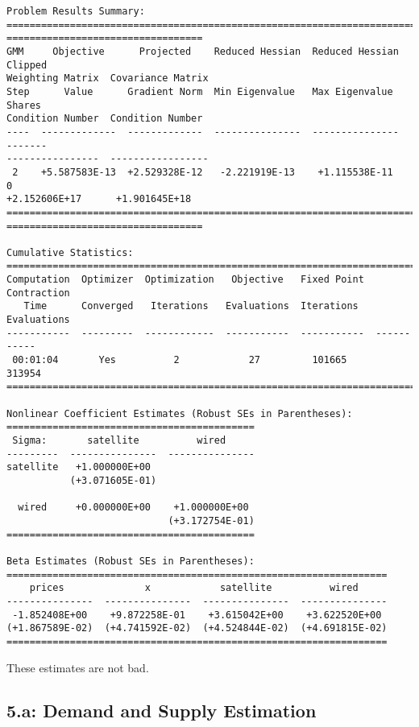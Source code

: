 \begin{Verbatim}[commandchars=\\\{\}]
Problem Results Summary:
================================================================================
==================================
GMM     Objective      Projected    Reduced Hessian  Reduced Hessian  Clipped
Weighting Matrix  Covariance Matrix
Step      Value      Gradient Norm  Min Eigenvalue   Max Eigenvalue   Shares
Condition Number  Condition Number
----  -------------  -------------  ---------------  ---------------  -------
----------------  -----------------
 2    +5.587583E-13  +2.529328E-12   -2.221919E-13    +1.115538E-11      0
+2.152606E+17      +1.901645E+18
================================================================================
==================================

Cumulative Statistics:
===========================================================================
Computation  Optimizer  Optimization   Objective   Fixed Point  Contraction
   Time      Converged   Iterations   Evaluations  Iterations   Evaluations
-----------  ---------  ------------  -----------  -----------  -----------
 00:01:04       Yes          2            27         101665       313954
===========================================================================

Nonlinear Coefficient Estimates (Robust SEs in Parentheses):
===========================================
 Sigma:       satellite          wired
---------  ---------------  ---------------
satellite   +1.000000E+00
           (+3.071605E-01)

  wired     +0.000000E+00    +1.000000E+00
                            (+3.172754E-01)
===========================================

Beta Estimates (Robust SEs in Parentheses):
==================================================================
    prices              x            satellite          wired
---------------  ---------------  ---------------  ---------------
 -1.852408E+00    +9.872258E-01    +3.615042E+00    +3.622520E+00
(+1.867589E-02)  (+4.741592E-02)  (+4.524844E-02)  (+4.691815E-02)
==================================================================
    \end{Verbatim}

    These estimates are not bad.

    \hypertarget{a-demand-and-supply-estimation}{%
\subsection{5.a: Demand and Supply
Estimation}\label{a-demand-and-supply-estimation}}

